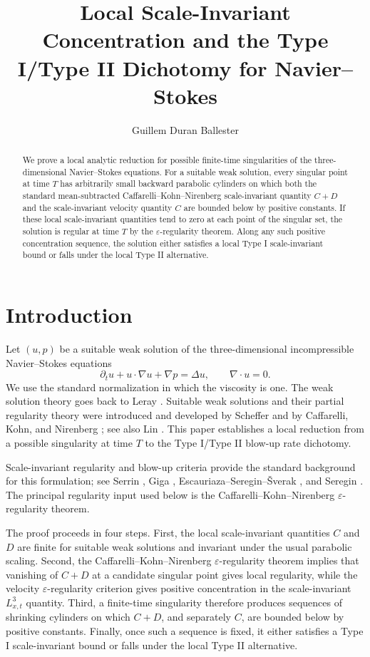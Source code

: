 \documentclass[11pt]{amsart}
\title[Local Concentration for Navier--Stokes]
{Local Scale-Invariant Concentration and the Type I/Type II Dichotomy
for Navier--Stokes}
\author{Guillem Duran Ballester}
\date{}
\theoremstyle{plain}
\theoremstyle{definition}
\theoremstyle{remark}
\begin{document}
\begin{abstract}
We prove a local analytic reduction for possible finite-time singularities of
the three-dimensional Navier--Stokes equations.  For a suitable weak solution,
every singular point at time \(T\) has arbitrarily small backward parabolic
cylinders on which both the standard mean-subtracted
Caffarelli--Kohn--Nirenberg scale-invariant quantity \(C+D\) and the
scale-invariant velocity quantity \(C\) are bounded below by positive
constants.  If these local scale-invariant quantities tend to zero at each
point of the singular set, the solution is regular at time \(T\) by the
\(\varepsilon\)-regularity theorem.  Along any such positive concentration
sequence, the solution either satisfies a local Type I scale-invariant bound or
falls under the local Type II alternative.
\end{abstract}

\maketitle

\section{Introduction}

Let \((u,p)\) be a suitable weak solution of the three-dimensional
incompressible Navier--Stokes equations
\[
  \partial_t u+u\cdot\nabla u+\nabla p=\Delta u,
  \qquad \nabla\cdot u=0.
\]
We use the standard normalization in which the viscosity is one.  The weak
solution theory goes back to Leray \cite{Leray1934}.  Suitable weak solutions
and their partial regularity theory were introduced and developed by Scheffer
\cite{Scheffer1976} and by Caffarelli, Kohn, and Nirenberg \cite{CKN1982}; see
also Lin \cite{Lin1998}.  This paper establishes a local reduction from a
possible singularity at time \(T\) to the Type I/Type II blow-up rate
dichotomy.

Scale-invariant regularity and blow-up criteria provide the standard background
for this formulation; see Serrin \cite{Serrin1962}, Giga \cite{Giga1986},
Escauriaza--Seregin--{\v S}verak \cite{ESS2003}, and Seregin
\cite{Seregin2012}.  The principal regularity input used below is the
Caffarelli--Kohn--Nirenberg \(\varepsilon\)-regularity theorem.

The proof proceeds in four steps.  First, the local scale-invariant
quantities \(C\) and \(D\) are finite for suitable weak solutions and invariant
under the usual parabolic scaling.  Second, the Caffarelli--Kohn--Nirenberg
\(\varepsilon\)-regularity theorem implies that vanishing of \(C+D\) at a
candidate singular point gives local regularity, while the velocity
\(\varepsilon\)-regularity criterion gives positive concentration in the
scale-invariant \(L^3_{x,t}\) quantity.  Third, a finite-time singularity
therefore produces sequences of shrinking cylinders on which \(C+D\), and
separately \(C\), are bounded below by positive constants.  Finally, once such
a sequence is fixed, it either satisfies a Type I scale-invariant bound or
falls under the local Type II alternative.
\end{document}
